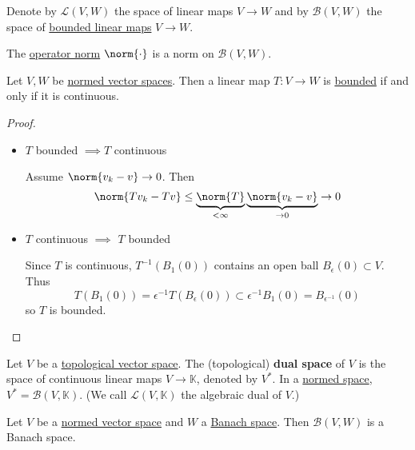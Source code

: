 \documentclass{article}
\newcommand{\K}{\mathbb{K}}
\begin{document}
Denote by $\mathcal{L}(V,W)$ the space of linear maps $V \to W$ and by $\mathcal{B}(V, W)$ the space of \hyperlink{def:boundedLinearMap}{bounded linear maps} $V \to W$.

\begin{fact}
    The \hyperlink{def:opNorm}{operator norm} $\norm{\cdot}$ is a norm on $\mathcal{B}(V, W)$.
\end{fact}


\begin{prop}
    Let $V, W$ be \hyperlink{def:normedVectorSpace}{normed vector spaces}. Then a linear map $T: V \to W$ is \hyperlink{def:boundedLinearMap}{bounded} if and only if it is continuous.
\end{prop}

\begin{proof}
    \leavevmode
    \begin{itemize}
        \item $T$ bounded $\implies T$ continuous

            Assume $\norm{v_k - v} \to 0$. Then
            \begin{equation*}
                \norm{T v_k - T v} \leq \underbrace{\norm{T}}_{< \infty} \underbrace{\norm{v_k - v}}_{\to 0} \to 0
            \end{equation*}
        \item $T$ continuous $\implies$ $T$ bounded

            Since $T$ is continuous, $T^{-1} (B_1(0))$ contains an open ball $B_\epsilon(0) \subset V$. Thus
            \begin{equation*}
                T(B_1(0)) = \epsilon^{-1} T(B_\epsilon(0)) \subset \epsilon^{-1} B_1(0) = B_{\epsilon^{-1}}(0)
            \end{equation*}
            so $T$ is bounded.
    \end{itemize}
\end{proof}

\begin{defi}
    Let $V$ be a \hyperlink{def:topologicalVectorSpace}{topological vector space}. The (topological) \textbf{dual space} of $V$ is the space of continuous linear maps $V \to \K$, denoted by $V^*$. In a \hyperlink{def:normedVectorSpace}{normed space}, $V^* = \mathcal{B}(V, \K)$. (We call $\mathcal{L}(V, \K)$ the algebraic dual of $V$.)
\end{defi}

\begin{prop}
    Let $V$ be a \hyperlink{def:normedVectorSpace}{normed vector space} and $W$ a \hyperlink{def:banach}{Banach space}. Then $\mathcal{B}(V, W)$ is a Banach space.
\end{prop}
\end{document}
